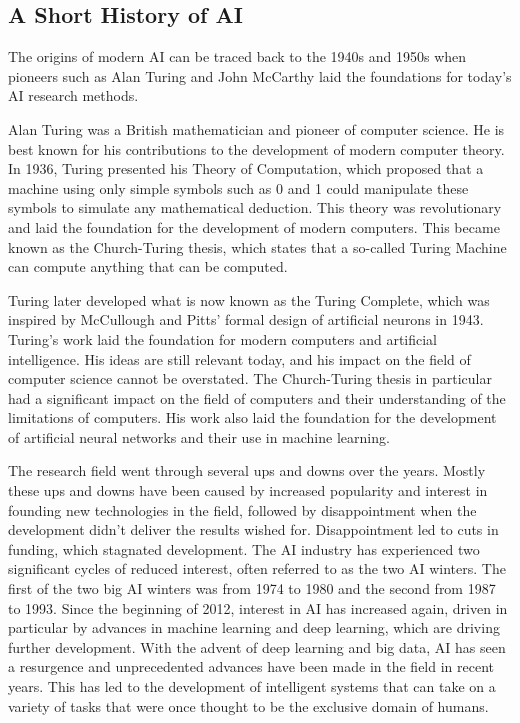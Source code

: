 \subsection{A Short History of AI}
The origins of modern AI can be traced back to the 1940s and 1950s when pioneers such as Alan Turing and John McCarthy laid the foundations for today's AI research methods. 

Alan Turing was a British mathematician and pioneer of computer science. He is best known for his contributions to the development of modern computer theory. In 1936, Turing presented his Theory of Computation, which proposed that a machine using only simple symbols such as 0 and 1 could manipulate these symbols to simulate any mathematical deduction. This theory was revolutionary and laid the foundation for the development of modern computers. This became known as the Church-Turing thesis, which states that a so-called Turing Machine can compute anything that can be computed. 

Turing later developed what is now known as the Turing Complete, which was inspired by McCullough and Pitts' formal design of artificial neurons in 1943. Turing's work laid the foundation for modern computers and artificial intelligence. His ideas are still relevant today, and his impact on the field of computer science cannot be overstated. The Church-Turing thesis in particular had a significant impact on the field of computers and their understanding of the limitations of computers. His work also laid the foundation for the development of artificial neural networks and their use in machine learning.

The research field went through several ups and downs over the years. Mostly these ups and downs have been caused by increased popularity and interest in founding new technologies in the field, followed by disappointment when the development didn't deliver the results wished for. Disappointment led to cuts in funding, which stagnated development. The AI industry has experienced two significant cycles of reduced interest, often referred to as the two AI winters. The first of the two big AI winters was from 1974 to 1980 and the second from 1987 to 1993. Since the beginning of 2012, interest in AI has increased again, driven in particular by advances in machine learning and deep learning, which are driving further development. With the advent of deep learning and big data, AI has seen a resurgence and unprecedented advances have been made in the field in recent years. This has led to the development of intelligent systems that can take on a variety of tasks that were once thought to be the exclusive domain of humans.


